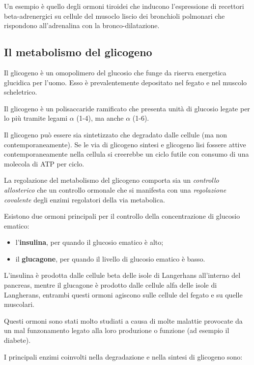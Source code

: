 \documentclass[]{article}
\begin{document}
Un esempio è quello degli ormoni tiroidei che inducono l'espressione di
recettori beta-adrenergici su cellule del musoclo liscio dei bronchioli
polmonari che rispondono all'adrenalina con la bronco-dilatazione.

\subsection{Il metabolismo del
glicogeno}\label{il-metabolismo-del-glicogeno}

Il glicogeno è un omopolimero del glucosio che funge da riserva
energetica glucidica per l'uomo. Esso è prevalentemente depositato nel
fegato e nel muscolo scheletrico.

Il glicogeno è un polisaccaride ramificato che presenta unità di
glucosio legate per lo più tramite legami \(\alpha\) (1-4), ma anche
\(\alpha\) (1-6).

Il glicogeno può essere sia sintetizzato che degradato dalle cellule (ma
non contemporaneamente). Se le via di glicogeno sintesi e glicogeno lisi
fossere attive contemporaneamente nella cellula si creerebbe un ciclo
futile con consumo di una molecola di ATP per ciclo.

La regolazione del metabolismo del glicogeno comporta sia un
\emph{controllo allosterico} che un controllo ormonale che si manifesta
con una \emph{regolazione covalente} degli enzimi regolatori della via
metabolica.

Esistono due ormoni principali per il controllo della concentrazione di
glucosio ematico:

\begin{itemize}
\itemsep1pt\parskip0pt
\item
  l'\textbf{insulina}, per quando il glucosio ematico è alto;
\item
  il \textbf{glucagone}, per quando il livello di glucosio ematico è
  basso.
\end{itemize}

L'insulina è prodotta dalle cellule beta delle isole di Langerhans
all'interno del pancreas, mentre il glucagone è prodotto dalle cellule
alfa delle isole di Langherans, entrambi questi ormoni agiscono sulle
cellule del fegato e su quelle muscolari.

Questi ormoni sono stati molto studiati a causa di molte malattie
provocate da un mal funzonamento legato alla loro produzione o funzione
(ad esempio il diabete).

I principali enzimi coinvolti nella degradazione e nella sintesi di
glicogeno sono:
\end{document}
